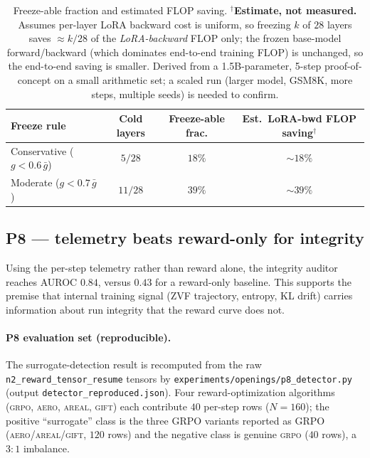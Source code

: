 \documentclass[11pt,a4paper]{article}
\begin{document}
\begin{table}[h]
\centering
\small
\begin{tabular}{lccc}
\toprule
Freeze rule & Cold layers & Freeze-able frac. & Est.\ LoRA-bwd FLOP saving$^{\dagger}$ \\
\midrule
Conservative ($g<0.6\,\bar{g}$) & $5/28$  & $18\%$ & $\sim\!18\%$ \\
Moderate ($g<0.7\,\bar{g}$)     & $11/28$ & $39\%$ & $\sim\!39\%$ \\
\bottomrule
\end{tabular}
\caption{Freeze-able fraction and estimated FLOP saving. $^{\dagger}$\textbf{Estimate,
not measured.} Assumes per-layer LoRA backward cost is uniform, so freezing $k$ of
$28$ layers saves $\approx k/28$ of the \emph{LoRA-backward} FLOP only; the frozen
base-model forward/backward (which dominates end-to-end training FLOP) is unchanged,
so the end-to-end saving is smaller. Derived from a 1.5B-parameter, 5-step
proof-of-concept on a small arithmetic set; a scaled run (larger model, GSM8K, more
steps, multiple seeds) is needed to confirm.}
\label{tab:p1-freeze-estimate}
\end{table}

\subsection{P8 --- telemetry beats reward-only for integrity}
Using the per-step telemetry rather than reward alone, the integrity auditor
reaches AUROC $0.84$, versus $0.43$ for a reward-only baseline. This supports the
premise that internal training signal (ZVF trajectory, entropy, KL drift) carries
information about run integrity that the reward curve does not.

\paragraph{P8 evaluation set (reproducible).} The surrogate-detection result is recomputed from the raw \texttt{n2\_reward\_tensor\_resume} tensors by \texttt{experiments/openings/p8\_detector.py} (output \texttt{detector\_reproduced.json}). Four reward-optimization algorithms (\textsc{grpo}, \textsc{aero}, \textsc{areal}, \textsc{gift}) each contribute $40$ per-step rows ($N=160$); the positive ``surrogate'' class is the three GRPO variants reported as GRPO (\textsc{aero}/\textsc{areal}/\textsc{gift}, $120$ rows) and the negative class is genuine \textsc{grpo} ($40$ rows), a $3{:}1$ imbalance. 
\end{document}
